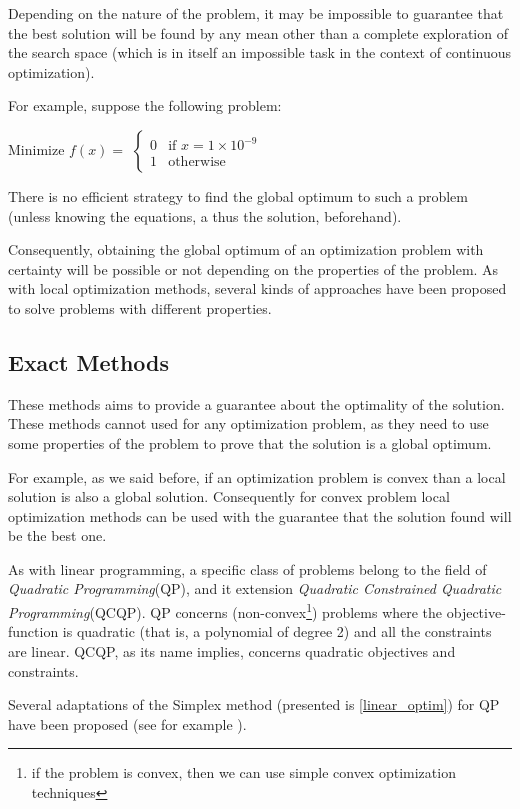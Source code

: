 Depending on the nature of the problem, it may be impossible to guarantee that the best solution will be found by any mean other than a complete exploration of the search space (which is in itself an impossible task in the context of continuous optimization).

For example, suppose the following problem:

Minimize $f(x) =$ $\begin{cases}
 		 					0& \text{if } x = 1 \times 10^{-9}\\
 		 					1& \text{otherwise}
 		 			\end{cases}$
 		 			
There is no efficient strategy to find the global optimum to such a problem (unless knowing the equations, a thus the solution, beforehand).

Consequently, obtaining the global optimum of an optimization problem with certainty will be possible or not depending on the properties of the problem.
As with local optimization methods, several kinds of approaches have been proposed to solve problems with different properties.

\subsection{Exact Methods}

These methods aims to provide a guarantee about the optimality of the solution. These methods cannot used for any optimization problem, as they need to use some properties of the problem to prove that the solution is a global optimum.

For example, as we said before, if an optimization problem is convex than a local solution is also a global solution. Consequently for convex problem local optimization methods can be used with the guarantee that the solution found will be the best one.

As with linear programming, a specific class of problems belong to the field of \emph{Quadratic Programming}(QP), and it extension \emph{Quadratic Constrained Quadratic Programming}(QCQP). QP concerns (non-convex\footnote{if the problem is convex, then we can use simple convex optimization techniques}) problems where the objective-function is quadratic (that is, a polynomial of degree 2) and all the constraints are linear. QCQP, as its name implies, concerns quadratic objectives and constraints.

Several adaptations of the Simplex method (presented is \ref{linear_optim}) for QP have been proposed (see for example \cite{wolfe1959simplex, dantzig1998linear, van1964simplicial}).


